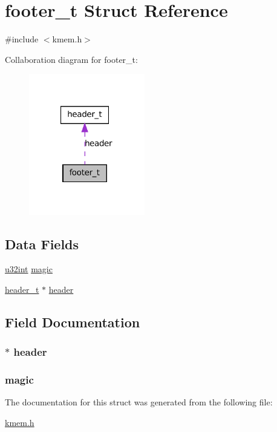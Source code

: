 \hypertarget{structfooter__t}{
\section{footer\_\-t Struct Reference}
\label{structfooter__t}
}


{\ttfamily \#include $<$kmem.h$>$}



Collaboration diagram for footer\_\-t:\nopagebreak
\begin{figure}[H]
\begin{center}
\leavevmode
\includegraphics[width=143pt]{structfooter__t__coll__graph}
\end{center}
\end{figure}
\subsection*{Data Fields}
\begin{DoxyCompactItemize}
\item 
\hyperlink{library_8h_ad7ecf93b77285d9bf039d27fa3f1a588}{u32int} \hyperlink{structfooter__t_a5a7b763a121d2c2573df337c8537a6a0}{magic}
\item 
\hyperlink{structheader__t}{header\_\-t} $\ast$ \hyperlink{structfooter__t_aeeb0a5ca163f802e1e3253c0eb9cca88}{header}
\end{DoxyCompactItemize}


\subsection{Field Documentation}
\hypertarget{structfooter__t_aeeb0a5ca163f802e1e3253c0eb9cca88}{
\subsubsection[{header}]{$\ast$ {\bf header}}}
\label{structfooter__t_aeeb0a5ca163f802e1e3253c0eb9cca88}
\hypertarget{structfooter__t_a5a7b763a121d2c2573df337c8537a6a0}{
\subsubsection[{magic}]{ {\bf magic}}}
\label{structfooter__t_a5a7b763a121d2c2573df337c8537a6a0}


The documentation for this struct was generated from the following file:\begin{DoxyCompactItemize}
\item 
\hyperlink{kmem_8h}{kmem.h}\end{DoxyCompactItemize}
